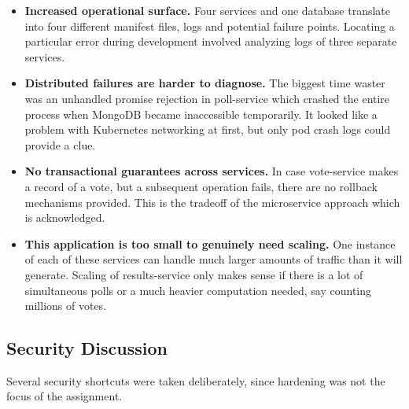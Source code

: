 \begin{itemize}
    \item \textbf{Increased operational surface.} Four services and one database translate into four different manifest files, logs and potential failure points. Locating a particular error during development involved analyzing logs of three separate services.

    \item \textbf{Distributed failures are harder to diagnose.} The biggest time waster was an unhandled promise rejection in poll-service which crashed the entire process when MongoDB became inaccessible temporarily. It looked like a problem with Kubernetes networking at first, but only pod crash logs could provide a clue.

    \item \textbf{No transactional guarantees across services.} In case vote-service makes a record of a vote, but a subsequent operation fails, there are no rollback mechanisms provided. This is the tradeoff of the microservice approach which is acknowledged.

    \item \textbf{This application is too small to genuinely need
        scaling.} One instance of each of these services can handle much larger amounts of traffic than it will generate. Scaling of results-service only makes sense if there is a lot of simultaneous polls or a much heavier computation needed, say counting millions of votes.
\end{itemize}

\subsection{Security Discussion}

Several security shortcuts were taken deliberately, since hardening was
not the focus of the assignment.

